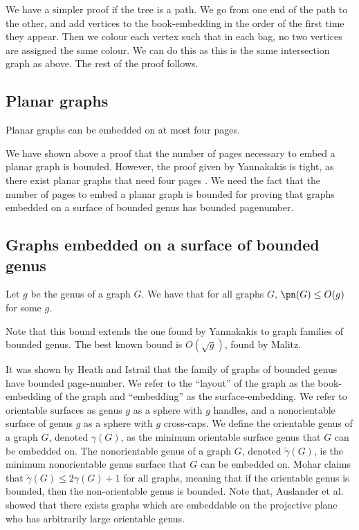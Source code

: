 We have a simpler proof if the tree is a path. We go from one end of the path to the other, and add vertices to the book-embedding in the order of the first time they appear. Then we colour each vertex such that in each bag, no two vertices are assigned the same colour. We can do this as this is the same intersection graph as above. The rest of the proof follows.

\subsection{Planar graphs}\label{ssec:Planar_Graphs}
\begin{theorem} \label{thm:4Pages_Planar}
	Planar graphs can be embedded on at most four pages.
\end{theorem}
We have shown above a proof that the number of pages necessary to embed a planar graph is bounded. However, the proof given by Yannakakis is tight, as there exist planar graphs that need four pages \cite{yannakakisPlanarGraphsThat2020} \cite{kaufmannFourPagesAre2020}. We need the fact that the number of pages to embed a planar graph is bounded for proving that graphs embedded on a surface of bounded genus has bounded pagenumber. 

\subsection{Graphs embedded on a surface of bounded genus}\label{ssec:pagenumber_bounded_genus}
\begin{theorem}\label{thm:Genus_pagenumber_bound}
	Let $g$ be the genus of a graph $G$. We have that for all graphs $G$, $\pn(G) \leq O(g)$ for some $g$.
\end{theorem}
Note that this bound extends the one found by Yannakakis \cite{yannakakisEmbeddingPlanarGraphs1989} to graph families of bounded genus. 
The best known bound is $O(\sqrt{g})$, found by Malitz\cite{malitzGenusGraphsHave1994}.

It was shown by Heath and Istrail that the family of graphs of bounded genus have bounded page-number. 
We refer to the ``layout'' of the graph as the book-embedding of the graph and ``embedding'' as the surface-embedding. We refer to orientable surfaces as genus $g$ as a sphere with $g$ handles, and a nonorientable surface of genus $g$ as a sphere with $g$ cross-caps. We define the orientable genus of a graph $G$, denoted $\gamma(G)$, as the minimum orientable surface genus that $G$ can be embedded on. The nonorientable genus of a graph $G$, denoted $\tilde{\gamma}(G)$, is the minimum nonorientable genus surface that $G$ can be embedded on. Mohar\cite{moharOrientableGenusGraphs1998} claims that $\tilde{\gamma}(G) \leq 2 \gamma(G) + 1$ for all graphs, meaning that if the orientable genus is bounded, then the non-orientable genus is bounded. Note that, Auslander et al.\cite{auslanderImbeddingGraphsManifolds1963} showed that there exists graphs which are embeddable on the projective plane who has arbitrarily large orientable genus. 
